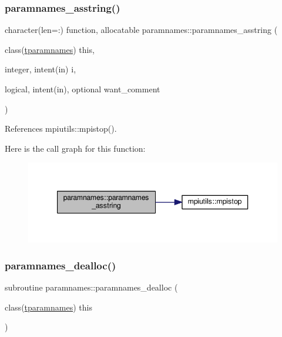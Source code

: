 \subsubsection{\texorpdfstring{paramnames\+\_\+asstring()}{paramnames\_asstring()}}
{\footnotesize\ttfamily character(len=\+:) function, allocatable paramnames\+::paramnames\+\_\+asstring (\begin{DoxyParamCaption}\item[{class(\mbox{\hyperlink{structparamnames_1_1tparamnames}{tparamnames}})}]{this,  }\item[{integer, intent(in)}]{i,  }\item[{logical, intent(in), optional}]{want\+\_\+comment }\end{DoxyParamCaption})\hspace{0.3cm}{\ttfamily [private]}}



References mpiutils\+::mpistop().

Here is the call graph for this function\+:
\nopagebreak
\begin{figure}[H]
\begin{center}
\leavevmode
\includegraphics[width=344pt]{namespaceparamnames_a16117a38b771ac05b4b1655b1f2d78a8_cgraph}
\end{center}
\end{figure}
\mbox{\label{namespaceparamnames_a0abbaf0b2bcd5b60c2d7c16746b07934}} 
\subsubsection{\texorpdfstring{paramnames\+\_\+dealloc()}{paramnames\_dealloc()}}
{\footnotesize\ttfamily subroutine paramnames\+::paramnames\+\_\+dealloc (\begin{DoxyParamCaption}\item[{class(\mbox{\hyperlink{structparamnames_1_1tparamnames}{tparamnames}})}]{this }\end{DoxyParamCaption})\hspace{0.3cm}{\ttfamily [private]}}

